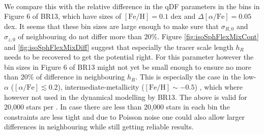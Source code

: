 \\We compare this with the relative difference in the qDF parameters in the bins in Figure 6 of BR13, which have sizes of $[\mathrm{Fe}/\mathrm{H}] = 0.1$ dex and $\Delta [\alpha/\mathrm{Fe}] = 0.05$ dex. It seems that these bin sizes are large enough to make sure that $\sigma_{R,0}$ and $\sigma_{z,0}$ of neighbouring \MAPs{} do not differ more than $20\%$. Figure \ref{fig:isoSphFlexMixCont} and \ref{fig:isoSphFlexMixDiff} suggest that especially the tracer scale length $h_R$ needs to be recovered to get the potential right. For this parameter however the bin sizes in Figure 6 of BR13 might not yet be small enough to ensure no more than $20\%$ of difference in neighbouring $h_R$. This is especially the case in the low-$\alpha$ ($[\alpha/\mathrm{Fe}] \lesssim 0.2$), intermediate-metallicity ($[\mathrm{Fe}/\mathrm{H}] \sim -0.5$) \MAPs{}, which where however not used in the dynamical modelling by BR13. The above is valid for 20,000 stars per \MAP{}. In case there are less than 20,000 stars in each bin the constraints are less tight and due to Poisson noise one could also allow larger differences in neighbouring \MAPs{} while still getting reliable results.\\

